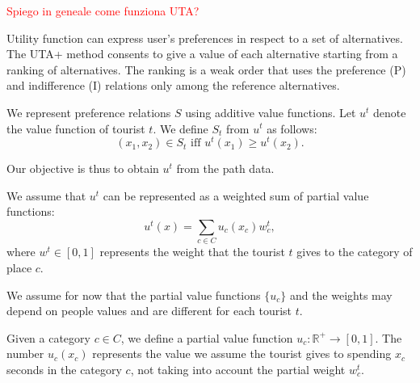 \documentclass[a4paper]{article}
\begin{document}
\textcolor{red}{Spiego in geneale come funziona UTA?}

Utility function can express user's preferences in respect to a set of alternatives. The UTA+ method consents to give a value of each alternative starting from a ranking of alternatives. The ranking is a weak order that uses the preference (P) and indifference (I) relations only among the reference alternatives.


We represent preference relations $S$ using additive value functions. Let $u^t$ denote the value function of tourist $t$. We define $S_t$ from  $u^t$ as follows:
\begin{equation}
(x_1,x_2) \in S_t \text { iff } u^t(x_1) \geq u^t(x_2).
\end{equation}

Our objective is thus to obtain $u^t$ from the path data.

We assume that $u^t$ can be represented as a weighted sum  of partial value functions:
\begin{equation}
u^t(x) = \sum_{c \in C} u_c(x_c) w^t_c,
\end{equation}
where $w^t \in [0,1]$ represents the weight that the tourist $t$ gives to the category of place $c$.

We assume for now that the partial value functions $\{u_c\}$ and the weights may depend on people values and are different for each tourist $t$.

Given a category $c \in C$, we define a partial value function $u_c:{\mathbb{R}^+} \rightarrow [0,1]$. The number $u_c(x_c)$ represents the value we assume the tourist gives to spending $x_c$ seconds in the category $c$, not taking into account the partial weight $w^t_c$.
\end{document}
